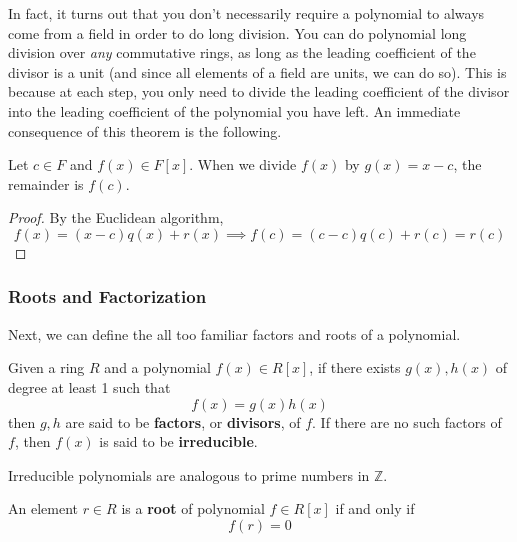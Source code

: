   In fact, it turns out that you don't necessarily require a polynomial to always come from a field in order to do long division. You can do polynomial long division over \textit{any} commutative rings, as long as the leading coefficient of the divisor is a unit (and since all elements of a field are units, we can do so). This is because at each step, you only need to divide the leading coefficient of the divisor into the leading coefficient of the polynomial you have left. An immediate consequence of this theorem is the following. 

  \begin{corollary}
    Let $c \in F$ and $f(x) \in F[x]$. When we divide $f(x)$ by $g(x) = x - c$, the remainder is $f(c)$. 
  \end{corollary}
  \begin{proof}
    By the Euclidean algorithm, 
    \begin{equation}
      f(x) = (x - c) q(x) + r(x) \implies f(c) = (c - c) q(c) + r(c) = r(c)
    \end{equation}
  \end{proof} 

\subsubsection{Roots and Factorization}

  Next, we can define the all too familiar factors and roots of a polynomial. 

  \begin{definition}[Factor]
    Given a ring $R$ and a polynomial $f(x) \in R[x]$, if there exists $g(x), h(x)$ of degree at least 1 such that 
    \begin{equation}
      f(x) = g(x) h(x)
    \end{equation}
    then $g, h$ are said to be \textbf{factors}, or \textbf{divisors}, of $f$. If there are no such factors of $f$, then $f(x)$ is said to be \textbf{irreducible}. 
  \end{definition}

  Irreducible polynomials are analogous to prime numbers in $\mathbb{Z}$. 

  \begin{definition}
    An element $r \in R$ is a \textbf{root} of polynomial $f \in R[x]$ if and only if 
    \begin{equation}
      f(r) = 0
    \end{equation}
  \end{definition} 

